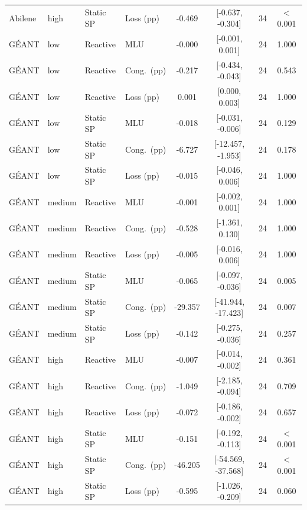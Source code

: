 \begin{table}[t]
\begin{tabular}{@{}llllcccc@{}}
Abilene & high & Static SP & Loss (pp) & -0.469 & [-0.637, -0.304] & 34 & $<$0.001 \\
G\'EANT & low & Reactive & MLU & -0.000 & [-0.001, 0.001] & 24 & 1.000 \\
G\'EANT & low & Reactive & Cong.\ (pp) & -0.217 & [-0.434, -0.043] & 24 & 0.543 \\
G\'EANT & low & Reactive & Loss (pp) & 0.001 & [0.000, 0.003] & 24 & 1.000 \\
G\'EANT & low & Static SP & MLU & -0.018 & [-0.031, -0.006] & 24 & 0.129 \\
G\'EANT & low & Static SP & Cong.\ (pp) & -6.727 & [-12.457, -1.953] & 24 & 0.178 \\
G\'EANT & low & Static SP & Loss (pp) & -0.015 & [-0.046, 0.006] & 24 & 1.000 \\
G\'EANT & medium & Reactive & MLU & -0.001 & [-0.002, 0.001] & 24 & 1.000 \\
G\'EANT & medium & Reactive & Cong.\ (pp) & -0.528 & [-1.361, 0.130] & 24 & 1.000 \\
G\'EANT & medium & Reactive & Loss (pp) & -0.005 & [-0.016, 0.006] & 24 & 1.000 \\
G\'EANT & medium & Static SP & MLU & -0.065 & [-0.097, -0.036] & 24 & 0.005 \\
G\'EANT & medium & Static SP & Cong.\ (pp) & -29.357 & [-41.944, -17.423] & 24 & 0.007 \\
G\'EANT & medium & Static SP & Loss (pp) & -0.142 & [-0.275, -0.036] & 24 & 0.257 \\
G\'EANT & high & Reactive & MLU & -0.007 & [-0.014, -0.002] & 24 & 0.361 \\
G\'EANT & high & Reactive & Cong.\ (pp) & -1.049 & [-2.185, -0.094] & 24 & 0.709 \\
G\'EANT & high & Reactive & Loss (pp) & -0.072 & [-0.186, -0.002] & 24 & 0.657 \\
G\'EANT & high & Static SP & MLU & -0.151 & [-0.192, -0.113] & 24 & $<$0.001 \\
G\'EANT & high & Static SP & Cong.\ (pp) & -46.205 & [-54.569, -37.568] & 24 & $<$0.001 \\
G\'EANT & high & Static SP & Loss (pp) & -0.595 & [-1.026, -0.209] & 24 & 0.060 \\
\bottomrule
\end{tabular}
\end{table}
